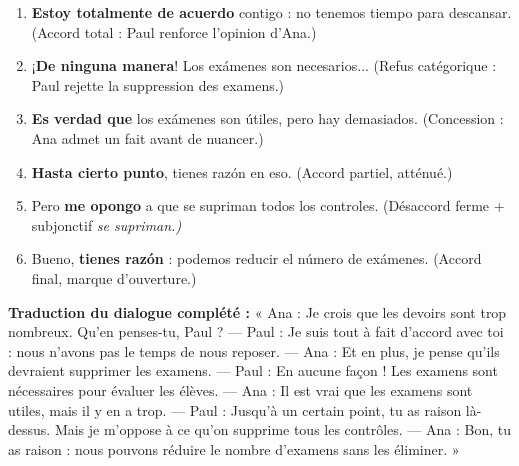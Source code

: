 \documentclass[11pt]{article}
\newcommand{\esp}[1]{\ifmmode\text{\textit{#1}}\else\begingroup\selectlanguage{spanish}\itshape #1\endgroup\fi}
\begin{document}
\begin{corrige}
\begin{enumerate}
\item \textbf{Estoy totalmente de acuerdo} contigo : no tenemos tiempo para descansar. (Accord total : Paul renforce l'opinion d'Ana.)
\item ¡\textbf{De ninguna manera}! Los exámenes son necesarios... (Refus catégorique : Paul rejette la suppression des examens.)
\item \textbf{Es verdad que} los exámenes son útiles, pero hay demasiados. (Concession : Ana admet un fait avant de nuancer.)
\item \textbf{Hasta cierto punto}, tienes razón en eso. (Accord partiel, atténué.)
\item Pero \textbf{me opongo} a que se supriman todos los controles. (Désaccord ferme + subjonctif \esp{se supriman}.)
\item Bueno, \textbf{tienes razón} : podemos reducir el número de exámenes. (Accord final, marque d'ouverture.)
\end{enumerate}
\textbf{Traduction du dialogue complété :} « Ana : Je crois que les devoirs sont trop nombreux. Qu'en penses-tu, Paul ? — Paul : Je suis tout à fait d'accord avec toi : nous n'avons pas le temps de nous reposer. — Ana : Et en plus, je pense qu'ils devraient supprimer les examens. — Paul : En aucune façon ! Les examens sont nécessaires pour évaluer les élèves. — Ana : Il est vrai que les examens sont utiles, mais il y en a trop. — Paul : Jusqu'à un certain point, tu as raison là-dessus. Mais je m'oppose à ce qu'on supprime tous les contrôles. — Ana : Bon, tu as raison : nous pouvons réduire le nombre d'examens sans les éliminer. »
\end{corrige}
\end{document}
